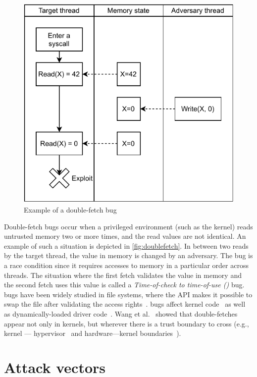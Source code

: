 \documentclass[letterpaper,twocolumn,10pt, anonymous]{article}
\begin{document}
\begin{figure}[]
  \centering
  \includegraphics[width=.8\linewidth]{img/doublefetch.pdf}
  \caption{Example of a double-fetch bug}
  \label{fig:doublefetch}
\end{figure}

Double-fetch bugs occur when a privileged environment (such as the kernel)
reads untrusted memory two or more times, and the read values are not 
identical. 
An example of such a situation is depicted in \autoref{fig:doublefetch}.
In between two reads by the target thread, the value in memory is changed
by an adversary.
The bug is a race condition since it requires accesses to memory in 
a particular order across threads.
The situation where the first fetch validates the value in memory and 
the second fetch uses this value is called a 
\emph{Time-of-check to time-of-use (\tocttou)} bug.
\tocttou bugs have been widely studied in file systems, where the 
API makes it possible to swap the file after validating the access 
rights~\cite{payer2012protecting,
pu2006methodical, wei2010modeling, tsafrir2008portably}.
\tocttou bugs affect kernel code~\cite{jurczyk2013bochspwn, wang2018survey}
as well as dynamically-loaded driver code~\cite{cve201812633,cve201812633fix}.
Wang et al.~\cite{wang2018survey} showed that double-fetches appear not only
in kernels, but wherever there is a trust boundary to cross (e.g., kernel ---
hypervisor~\cite{wilhelm2016xenpwn} and hardware---kernel
boundaries~\cite{lu2018untrusted}). 


\section{Attack vectors}
\label{sec:threats}
\end{document}
